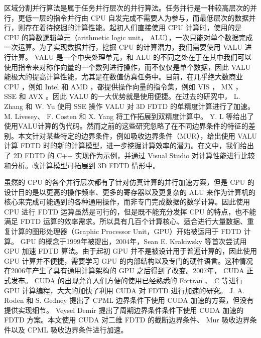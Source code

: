 区域分割并行算法是属于任务并行层次的并行算法。任务并行是一种较高层次的并行，更低一层的指令并行由 CPU 自发完成不需要人为参与，而最低层次的数据并行，则存在着待挖掘的计算性能。起初人们直接使用 CPU 计算时，使用的是 CPU 的算数逻辑单元（arithmetic logic unit， ALU），一次只能对单个数据完成一次运算。为了实现数据并行，挖掘 CPU 的计算潜力，我们需要使用 VALU 进行计算。 VALU 是一个中央处理单元，和 ALU 的不同之处在于在其中我们可以使用指令来对称作向量的一个数列进行操作，而不仅仅是单个数据，因此 VALU 能极大的提高计算性能，尤其是在数值仿真任务中。目前，在几乎绝大数商业 CPU ，例如 Intel 和 AMD ，都提供操作向量的指令集，例如 VIS ， MX ， SSE 和 AVX 。因此 VALU 的一大优势就是使用便捷。在过去的研究中， L. Zhang 和 W. Yu \cite{LZhangandWYu} 使用 SSE 操作 VALU 对 3D FDTD 的单精度计算进行了加速。 M. Livesey、 F. Costen 和 X. Yang \cite{Doubleprecision} 将工作拓展到双精度计算中。 Y. L \cite{AdvancedFDTDMethod} 等给出了使用VALU计算的伪代码。然而之前的这些研究忽略了在不同边界条件的特征的差别。本文针对某些特定的边界条件，例如吸收边界条件（MUR），给出使用 VALU 计算 FDTD 时的新的计算模型，进一步挖掘计算效率的潜力。在文中，我们给出了 2D FDTD 的 C++ 实现作为示例，并通过 Visual Studio 对计算性能进行比较和分析。改计算模型可拓展到 3D FDTD 情形中。

虽然的 CPU 的各个并行层次都有了针对仿真计算的并行加速方案，但是 CPU 的设计目的是以更高的操作频率、更多的寄存器以及更复杂的 ALU 来作为计算机的核心来完成可能遇到的各种通用操作，而非专门完成数据的数学计算。因此使用 CPU 进行 FDTD 运算虽然是可行的，但是既不能充分发挥 CPU 的特点，也不能满足 FDTD 运算的效率需求。所以具有几百个计算核心、适合进行大量数据、重复计算的图形处理器（Graphic Processor Unit，GPU）开始被运用于 FDTD 计算。 GPU 的概念于1999年被提出，2004年，Sean E. Krakiwsky 等\cite{Krakiwsky}首次尝试用 GPU 加速 FDTD 算法。由于起初 GPU 并不是被设计用于普遍计算的，因此使用 GPU 计算并不便捷，需要学习 GPU 的内部结构以及专门的硬件语言。这种情况在2006年产生了具有通用计算架构的 GPU 之后得到了改变。2007年， CUDA 正式发布。 CUDA 的出现允许人们方便的使用已经熟悉的 Fortran 、 C 等进行 GPU 计算编程，大大的加快了利用 CUDA 对 FDTD 进行加速的研究。 J. A. Roden 和 S. Gedney\cite{Roden} 提出了 CPML 边界条件下使用 CUDA 加速的方案，但没有提供实现细节。 Veysel Demir \cite{Demir}提出了周期边界条件条件下使用 CUDA 加速的 FDTD 方案。本文使用 CUDA 对二维 FDTD 的截断边界条件、 Mur 吸收边界条件以及 CPML 吸收边界条件进行加速。

